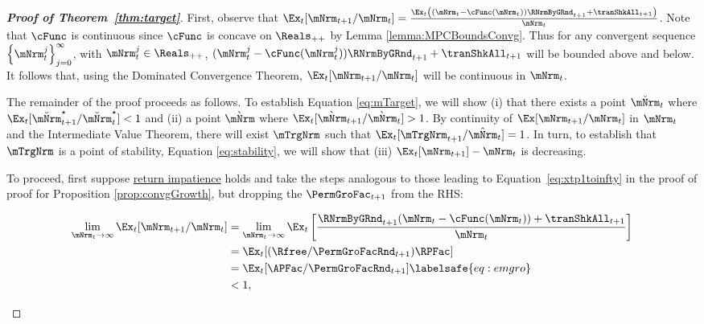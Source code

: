 \documentclass[\econtexRoot/BufferStockTheory]{subfiles}
\begin{document}
\begin{proof}[\textbf{Proof of Theorem~\ref{thm:target}}]

First, observe that $\Ex_{t}[{\mNrm}_{t+1}/\mNrm_t] = \frac{\Ex_{t}\left((\mNrm_t - \cFunc(\mNrm_t)) \RNrmByGRnd_{t+1} + \tranShkAll_{t+1}\right)}{\mNrm_t}$.
Note that $\cFunc$ is continuous since $\cFunc$ is concave on $\Reals_{++}$ by Lemma \ref{lemma:MPCBoundsConvg}.
Thus for any convergent sequence $\left\{\mNrm_t^{j}\right\}_{j=0}^{\infty}$, with $\mNrm_t^{j}\in \Reals_{++}$, $(\mNrm_t^{j} - \cFunc(\mNrm_t^{j})) \RNrmByGRnd_{t+1} + \tranShkAll_{t+1}$ will be bounded above and below.
It follows that, using the Dominated Convergence Theorem, $\Ex_{t}[{\mNrm}_{t+1}/\mNrm_t]$ will be continuous in $\mNrm_t$.



The remainder of the proof proceeds as follows.
To establish Equation \eqref{eq:mTarget}, we will show (i) that there exists a point $\breve{\mNrm}_{t}$ where $\Ex_t [\breve{\mNrm}_{t+1}^{\star}/\breve{\mNrm}_{t}^{\star}] < 1$ and (ii) a point $\grave{\mNrm}$ where $\Ex_t [\grave{\mNrm}_{t+1}/\grave{\mNrm}_{t}] > 1$.
By continuity of $\Ex[{\mNrm}_{t+1}/\mNrm_t]$ in $\mNrm_t$ and the Intermediate Value Theorem, there will exist $\mTrgNrm$ such that  $\Ex_t [{\mTrgNrm}_{t+1}/\hat{\mNrm}_{t}] = 1$.
In turn, to establish that $\mTrgNrm$ is a point of stability, Equation \eqref{eq:stability}, we will show that (iii) $\Ex_t [{\mNrm}_{t+1}]-\mNrm_{t}$ is decreasing.



To proceed, first suppose \hyperlink{RIC}{return impatience} holds and take the steps analogous to those leading to Equation~\eqref{eq:xtp1toinfty} in the proof of proof for Proposition \ref{prop:convgGrowth},  but dropping the $\PermGroFac_{t+1}$ from the RHS:
\begin{samepage}
\begin{equation}\begin{gathered}\begin{aligned}
  \lim_{\mNrm_{t} \rightarrow \infty} \Ex_{t}[{\mNrm}_{t+1}/\mNrm_{t}]  & =   
                                                                       \lim_{\mNrm_{t} \rightarrow \infty} 
                                                                       \Ex_{t}\left[\frac{\RNrmByGRnd_{t+1}(\mNrm_{t}-\cFunc(\mNrm_{t}))+{\tranShkAll}_{t+1}}{\mNrm_{t}}\right] \notag 
  \\  & = \Ex_{t}[(\Rfree/{\PermGroFacRnd}_{t+1})\RPFac]  \notag
  \\  & = \Ex_{t}[{\APFac}/{\PermGroFacRnd}_{t+1}]  \labelsafe{eq:emgro}
  \\  & < 1, \notag
\end{aligned}\end{gathered}\end{equation}
\end{samepage}


\end{proof}
\end{document}
